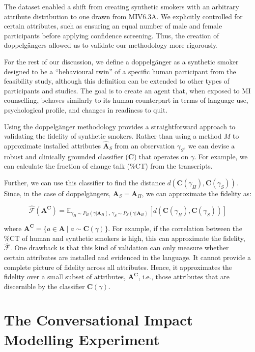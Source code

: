 The dataset enabled a shift from creating synthetic smokers with an arbitrary attribute distribution to one drawn from MIV6.3A. We explicitly controlled for certain attributes, such as ensuring an equal number of male and female participants before applying confidence screening. Thus, the creation of doppelgängers allowed us to validate our methodology more rigorously.

For the rest of our discussion, we define a doppelgänger as a synthetic smoker designed to be a ``behavioural twin'' of a specific human participant from the feasibility study, although this definition can be extended to other types of participants and studies. The goal is to create an agent that, when exposed to MI counselling, behaves similarly to its human counterpart in terms of language use, psychological profile, and changes in readiness to quit.

Using the doppelgänger methodology provides a straightforward approach to validating the fidelity of synthetic smokers. Rather than using a method $M$ to approximate installed attributes $\hat{\textbf{A}}_S$ from an observation $\gamma_S$, we can devise a robust and clinically grounded classifier ($\textbf{C}$) that operates on $\gamma$. For example, we can calculate the fraction of change talk (\%CT) from the transcripts.

Further, we can use this classifier to find the distance $d(\textbf{C}(\gamma_H), \textbf{C}(\gamma_S))$. Since, in the case of doppelgängers, $\textbf{A}_S = \textbf{A}_H$, we can approximate the fidelity as:

$$\hat{\mathcal{F}}(\textbf{A}^\textbf{C}) = \mathbb{E}_{\gamma_H \sim P_H (\gamma | \textbf{A}_H),  \:  \gamma_S \sim P_S(\gamma | \textbf{A}_H)}[d(
\textbf{C}(\gamma_H),\textbf{C}(\gamma_S)
)]$$


where $\textbf{A}^\textbf{C} = \{a \in \textbf{A} \mid a \sim \textbf{C}(\gamma)\}$. For example, if the correlation between the \%CT of human and synthetic smokers is high, this can approximate the fidelity, $\hat{\mathcal{F}}$. One drawback is that this kind of validation can only measure whether certain attributes are installed and evidenced in the language. It cannot provide a complete picture of fidelity across all attributes. Hence, it approximates the fidelity over a small subset of attributes, $\textbf{A}^\textbf{C}$, i.e., those attributes that are discernible by the classifier $\textbf{C}(\gamma)$.



\section{The Conversational Impact Modelling Experiment}
\label{sec:transcript-autoplay}

